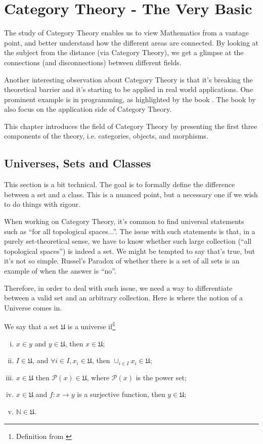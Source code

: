 \chapter{Category Theory - The Very Basic}

The study of Category Theory enables us to view Mathematics from a vantage
point, and better understand how the different areas are connected.
By looking at the subject from the distance (via Category Theory), we get
a glimpse at the connections (and disconnections) between different fields.

Another interesting observation about Category Theory is that it's
breaking the theoretical barrier and it's starting to be applied
in real world applications. One prominent example is in programming,
as highlighted by the book \citet{milewski2018category}.
The book by \citet{fong2019invitation} also focus on the application
side of Category Theory.

This chapter introduces the field of Category Theory by
presenting the first three components of the theory, i.e.
categories, objects, and morphisms.

\section{Universes, Sets and Classes}

This section is a bit technical. The goal is to formally
define the difference between a set and a class. This is a nuanced
point, but a necessary one if we wish to do things with rigour.

When working on Category Theory, it's common to find universal
statements such as ``for all topological spaces...''. The issue
with such statements is that, in a purely set-theoretical sense,
we have to know whether such large collection (``all topological spaces'')
is indeed a set. We might be tempted to say that's true, but
it's not so simple. Russel's Paradox of whether there is a set of all sets
is an example of when the answer is ``no''.

Therefore, in order to deal with such issue, we need a way to differentiate
between a valid set and an arbitrary collection. Here is where the notion of a Universe comes in.

\begin{definition}[Universe]
	We say that a set $\mathfrak U$ is a universe if\footnote{Definition from \citet{borceux1994handbook}}
	\begin{enumerate}[(i)]
		\item $x\in y$ and $ y\in \mathfrak U$, then $x \in \mathfrak U$;
		\item $I \in \mathfrak U$, and $\forall i \in I, x_i \in \mathfrak U$, then $\cup_{i\in I}x_i \in \mathfrak U$;
		\item $x \in \mathfrak U$ then $\mathcal P(x) \in \mathfrak U$, where $\mathcal P(x)$ is the power set;
		\item $x \in \mathfrak U$ and $f:x\to y$ is a surjective function, then $y \in \mathfrak U$;
		\item $\mathbb N \in \mathfrak U$.
	\end{enumerate}
\end{definition}

